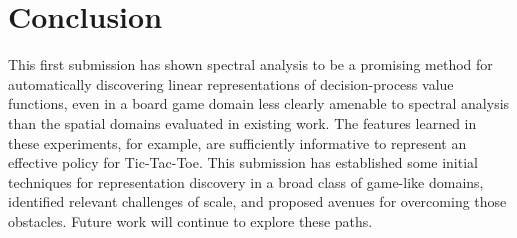 \section{Conclusion}

This first submission has shown spectral analysis to be a promising method for
automatically discovering linear representations of decision-process value
functions, even in a board game domain less clearly amenable to spectral
analysis than the spatial domains evaluated in existing work. The features
learned in these experiments, for example, are sufficiently informative to
represent an effective policy for Tic-Tac-Toe. This submission has established
some initial techniques for representation discovery in a broad class of
game-like domains, identified relevant challenges of scale, and proposed
avenues for overcoming those obstacles. Future work will continue to explore
these paths.

